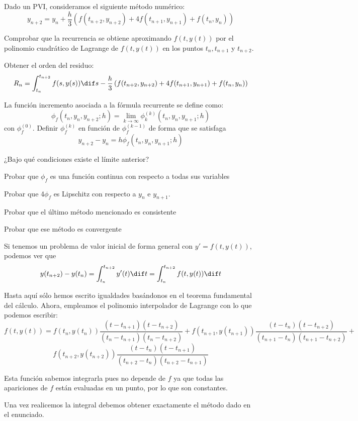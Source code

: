 \begin{problem}[4]
Dado un PVI, consideramos el siguiente método numérico:
\[y_{n+2}=y_n+\frac{h}{3}\left(f(t_{n+2},y_{n+2})+4f(t_{n+1},y_{n+1}) + f(t_n,y_n) \right)\]

\ppart Comprobar que la recurrencia se obtiene aproximando $f(t,y(t))$ por el polinomio cuadrático de Lagrange de $f(t,y(t))$ en los puntos $t_n,t_{n+1}$ y $t_{n+2}$.

\ppart Obtener el orden del residuo:
\[R_n = \int_{t_n}^{t_{n+2}}f(s,y(s))\dif s -\frac{h}{3}\left(f(t_{n+2},y_{n+2})+4f(t_{n+1},y_{n+1}) + f(t_n,y_n) \right)\]

\ppart La función incremento asociada a la fórmula recurrente se define como:
\[\phi_f(t_n,y_n,y_{n+2};h) = \lim_{k\to \infty}\phi_k^{(k)}(t_n,y_n,y_{n+1};h)\]
con $\phi_f^{(0)}$. Definir $\phi_f^{(k)}$ en función de $\phi_f^{(k-1)}$ de forma que se satisfaga
\[y_{n+2}-y_n = h \phi_f(t_n,y_n,y_{n+1};h) \]

¿Bajo qué condiciones existe el límite anterior?

\ppart Probar que $\phi_f$ es una función continua con respecto a todas sus variables

\ppart Probar que 4$\phi_f$ es Lipschitz con respecto a $y_n$ e $y_{n+1}$.

\ppart Probar que el último método mencionado es consistente

\ppart Probar que ese método es convergente
\solution

\spart

Si tenemos un problema de valor inicial de forma general con $y'=f(t,y(t))$, podemos ver que
\[y(t_{n+2}) - y(t_n) = \int_{t_n}^{t_{n+2}}y'(t)\dif t =\int_{t_n}^{t_{n+2}}f(t,y(t))\dif t \]

Hasta aquí sólo hemos escrito igualdades basándonos en el teorema fundamental del cálculo. Ahora, empleamos el polinomio interpolador de Lagrange con lo que podemos escribir:
\[f(t,y(t))=f(t_n,y(t_n))\frac{(t-t_{n+1})(t-t_{n+2})}{(t_n-t_{n+1})(t_n-t_{n+2})} + f(t_{n+1},y(t_{n+1}))\frac{(t-t_n)(t-t_{n+2})}{(t_{n+1}-t_n)(t_{n+1}-t_{n+2})} +\]
\[f(t_{n+2},y(t_{n+2})) \frac{(t-t_n)(t-t_{n+1})}{(t_{n+2}-t_n)(t_{n+2}-t_{n+1})}\]

Esta función sabemos integrarla pues no depende de $f$ ya que todas las apariciones de $f$ están evaluadas en un punto, por lo que son constantes.

Una vez realicemos la integral debemos obtener exactamente el método dado en el enunciado.

\spart


\end{problem}

